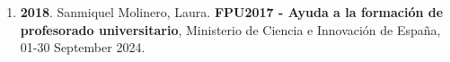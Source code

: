 \begin{enumerate}
\item {\bf 2018}. Sanmiquel Molinero, Laura. {\bf FPU2017 - Ayuda a la formación de profesorado universitario}, Ministerio de Ciencia e Innovación de España, 01-30 September 2024.\filbreak
\end{enumerate} 
